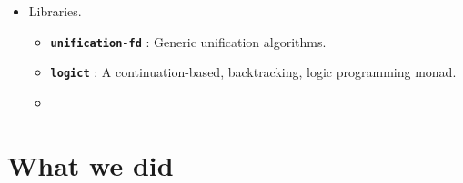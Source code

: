 \documentclass[hideothersubsections, t, aspectratio=1610]{beamer}
\providecommand\codeLibrary[1]{\texttt{\bfseries #1}}
\begin{document}
\begin{frame}
\begin{itemize}
\item Libraries.
\begin{itemize}
\item \codeLibrary{unification-fd} : Generic unification algorithms. 

\item \codeLibrary{logict} : A continuation-based, backtracking, logic programming monad.

\item \codeLibrary{}
\note[item]{}

\end{itemize}

\end{itemize}

\end{frame}



\section{What we did}
\end{document}
